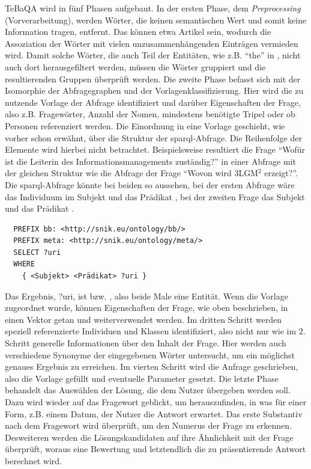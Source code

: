 TeBaQA wird in fünf Phasen aufgebaut.
In der ersten Phase, dem \emph{Preprocessing} (Vorverarbeitung), werden Wörter, die keinen semantischen Wert und somit keine Information tragen, entfernt.
Das können etwa Artikel sein, wodurch die Assoziation der Wörter mit vielen unzusammenhängenden Einträgen vermieden wird.
Damit solche Wörter, die auch Teil der Entitäten, wie z.B. \enquote{the} in ,
nicht auch dort herausgefiltert werden, müssen die Wörter gruppiert und die resultierenden Gruppen überprüft werden.
Die zweite Phase befasst sich mit der Isomorphie der Abfragegraphen und der Vorlagenklassifizierung.
Hier wird die zu nutzende Vorlage der Abfrage identifiziert und darüber Eigenschaften der Frage, also z.B. Fragewörter,
Anzahl der Nomen, mindestens benötigte Tripel oder ob Personen referenziert werden.
Die Einordnung in eine Vorlage geschieht, wie vorher schon erwähnt, über die Struktur der \ac{sparql}-Abfrage.
Die Reihenfolge der Elemente wird hierbei nicht betrachtet.
Beispielsweise resultiert die Frage \enquote{Wofür ist die Leiterin des Informationsmanagements zuständig?}
in einer Abfrage mit der gleichen Struktur wie die Abfrage der Frage \enquote{Wovon wird 3LGM$^2$ erzeigt?}.
Die \ac{sparql}-Abfrage könnte bei beiden so aussehen, bei der ersten Abfrage wäre das Individuum im Subjekt  und das Prädikat ,
bei der zweiten Frage das Subjekt  und das Prädikat .
\begin{lstlisting}
  PREFIX bb: <http://snik.eu/ontology/bb/>
  PREFIX meta: <http://snik.eu/ontology/meta/>
  SELECT ?uri
  WHERE
    { <Subjekt> <Prädikat> ?uri }
\end{lstlisting}
Das Ergebnis, ?uri, ist  bzw. , also beide Male eine Entität.
Wenn die Vorlage zugeordnet wurde, können Eigenschaften der Frage, wie oben beschrieben, in einen Vektor getan und weiterverwendet werden.
Im dritten Schritt werden speziell referenzierte Individuen und Klassen identifiziert, also nicht nur wie im 2. Schritt generelle Informationen über den Inhalt der Frage.
Hier werden auch verschiedene Synonyme der eingegebenen Wörter untersucht, um ein möglichst genaues Ergebnis zu erreichen.
Im vierten Schritt wird die Anfrage geschrieben, also die Vorlage gefüllt und eventuelle Parameter gesetzt.
Die letzte Phase behandelt das Auswählen der Lösung, die dem Nutzer übergeben werden soll.
Dazu wird wieder auf das Fragewort geblickt, um herauszufinden, in was für einer Form, z.B. einem Datum, der Nutzer die Antwort erwartet.
Das erste Substantiv nach dem Fragewort wird überprüft, um den Numerus der Frage zu erkennen.
Desweiteren werden die Lösungskandidaten auf ihre Ähnlichkeit mit der Frage überprüft, woraus eine Bewertung und letztendlich die zu präsentierende Antwort berechnet wird.

